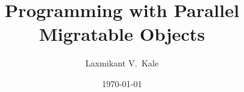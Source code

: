 \documentclass{beamer}
\title{Programming with Parallel Migratable Objects}
\author[Laxmikant V.~Kale]{Laxmikant V.~Kale}
\date{\today}
\begin{document}
\begin{frame}
  
  
  
  
  
  
  
  
  
  
  
  
  
  
  
  
  
  
  
\end{frame}
\end{document}
